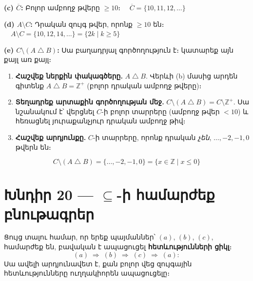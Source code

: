\documentclass[12pt, a4paper]{article}
\newcommand{\Z}{\mathbb{Z}}
\newcommand{\comp}[1]{\overline{#1}}
\newcommand{\symdiff}{\mathbin{\triangle}}
\begin{document}
\textbf{(c)\; $\comp{C}$:}\;
Բոլոր ամբողջ թվերը $\ge 10$։
$\quad\boxed{\comp{C} = \{10, 11, 12, \ldots\}}$

\textbf{(d)\; $A \setminus C$:}\;
Դրական զույգ թվեր, որոնք $\ge 10$ են։
$\quad\boxed{A \setminus C = \{10, 12, 14, \ldots\} = \{2k \mid k \ge 5\}}$

\textbf{(e)\; $C \setminus (A \symdiff B)$:}\;
Սա բաղադրյալ գործողություն է։ կատարեք այն քայլ առ քայլ։

\begin{enumerate}[label=\textbf{Քայլ \arabic*։}, leftmargin=*, nosep, itemsep=4pt]
  \item \textbf{Հաշվեք ներքին փակագծերը.}\;
        $A \symdiff B$. Վերևի (b) մասից արդեն գիտենք
        $\boxed{A \symdiff B = \Z^+}$ (բոլոր դրական ամբողջ թվերը)։

  \item \textbf{Տեղադրեք արտաքին գործողության մեջ.}\;
        $C \setminus (A \symdiff B) = C \setminus \Z^+$.
        Սա նշանակում է՝ վերցնել $C$-ի բոլոր տարրերը (ամբողջ թվեր $< 10$) և
        հեռացնել յուրաքանչյուր դրական ամբողջ թիվ։

  \item \textbf{Հաշվեք արդյունքը.}\;
        $C$-ի տարրերը, որոնք դրական \emph{չեն},
        $\ldots, -2, -1, 0$ թվերն են։
\end{enumerate}
\[
  \boxed{C \setminus (A \symdiff B) = \{\ldots, -2, -1, 0\}
         = \{x \in \Z \mid x \le 0\}}
\]

\newpage
\section{Խնդիր 20 — $\subseteq$-ի համարժեք բնութագրեր}

\begin{theorybox}
Ցույց տալու համար, որ երեք պայմաններ՝ $(a)$, $(b)$, $(c)$, համարժեք են, բավական է ապացուցել
\textbf{հետևությունների ցիկլ}։
\[
  (a) \;\Longrightarrow\; (b) \;\Longrightarrow\; (c) \;\Longrightarrow\; (a):
\]
Սա ավելի արդյունավետ է, քան բոլոր վեց զույգային հետևությունները ուղղակիորեն ապացուցելը։

\begin{center}
\end{center}
\end{theorybox}
\end{document}
